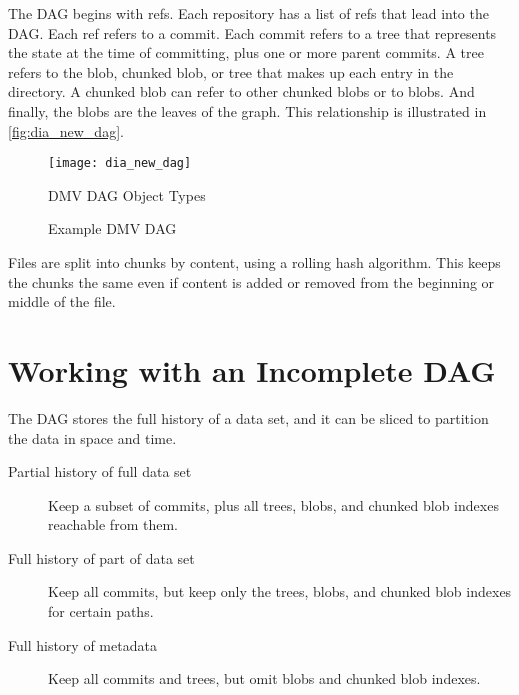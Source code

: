 The DAG begins with refs. Each repository has a list of refs that lead into the
DAG. Each ref refers to a commit. Each commit refers to a tree that represents
the state at the time of committing, plus one or more parent commits. A tree
refers to the blob, chunked blob, or tree that makes up each entry in the
directory. A chunked blob can refer to other chunked blobs or to blobs. And
finally, the blobs are the leaves of the graph. This relationship is illustrated
in \autoref{fig:dia_new_dag}.


\begin{figure}[]
    \centering
        \texttt{[image: dia\_new\_dag]}
    \caption{DMV DAG Object Types}
    \label{fig:dia_new_dag}
\end{figure}

\begin{figure}[]
    \centering
    \caption{Example DMV DAG}
    \label{dia_example_dmv_dag}
\end{figure}


Files are split into chunks by content, using a rolling hash algorithm. This
keeps the chunks the same even if content is added or removed from the beginning
or middle of the file.

%


\section{Working with an Incomplete DAG}

The DAG stores the full history of a data set, and it can be sliced to partition
the data in space and time.

\begin{description}

    \item[Partial history of full data set] Keep a subset of commits, plus all
        trees, blobs, and chunked blob indexes reachable from them.

    \item[Full history of part of data set] Keep all commits, but keep only the
        trees, blobs, and chunked blob indexes for certain paths.

    \item[Full history of metadata] Keep all commits and trees, but
        omit blobs and chunked blob indexes.

\end{description}


